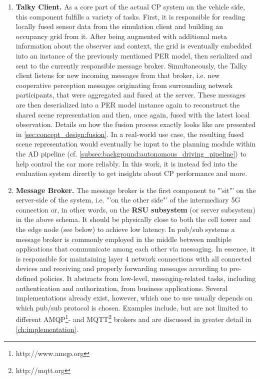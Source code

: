 \begin{enumerate}[C1: ]
	\item \textbf{Talky Client.} As a core part of the actual CP system on the vehicle side, this component fulfills a variety of tasks. First, it is responsible for reading locally fused sensor data from the simulation client and building an occupancy grid from it. After being augmented with additional meta information about the observer and context, the grid is eventually embedded into an instance of the previously mentioned PER model, then serialized and sent to the currently responsible message broker. Simultaneously, the Talky client listens for new incoming messages from that broker, i.e. new cooperative perception messages originating from surrounding network participants, that were aggregated and fused at the server. These messages are then deserialized into a PER model instance again to reconstruct the shared scene representation and then, once again, fused with the latest local observation. Details on how the fusion process exactly looks like are presented in \cref{sec:concept_design:fusion}. In a real-world use case, the resulting fused scene representation would eventually be input to the planning module within the AD pipeline (cf. \cref{subsec:background:autonomous_driving_pipeline}) to help control the car more reliably. In this work, it is instead fed into the evaluation system directly to get insights about CP performance and more.
	\item \textbf{Message Broker.} The message broker is the first component to "'sit"' on the server-side of the system, i.e. "'on the other side"' of the intermediary 5G connection or, in other words, on the \textbf{RSU subsystem} (or server subsystem) in the above schema. It should be physically close to both the cell tower and the edge node (see below) to achieve low latency. In pub/sub systems a message broker is commonly employed in the middle between multiple applications that communicate among each other via messaging. In essence, it is responsible for maintaining layer 4 network connections with all connected devices and receiving and properly forwarding messages according to pre-defined policies. It abstracts from low-level, messaging-related tasks, including authentication and authorization, from business applications. Several implementations already exist, however, which one to use usually depends on which pub/sub protocol is chosen. Examples include, but are not limited to different AMQP\footnote{http://www.amqp.org}- and MQTT\footnote{http://mqtt.org} brokers and are discussed in greater detail in \cref{ch:implementation}.

\end{enumerate}
